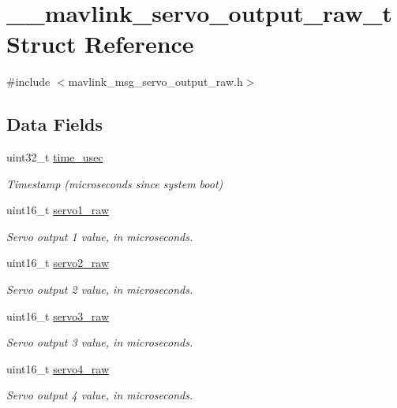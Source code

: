 \hypertarget{struct____mavlink__servo__output__raw__t}{\section{\+\_\+\+\_\+mavlink\+\_\+servo\+\_\+output\+\_\+raw\+\_\+t Struct Reference}
\label{struct____mavlink__servo__output__raw__t}
}


{\ttfamily \#include $<$mavlink\+\_\+msg\+\_\+servo\+\_\+output\+\_\+raw.\+h$>$}

\subsection*{Data Fields}
\begin{DoxyCompactItemize}
\item 
uint32\+\_\+t \hyperlink{struct____mavlink__servo__output__raw__t_a77950505a736593e2c35132a1688c8f1}{time\+\_\+usec}
\begin{DoxyCompactList}\small\item\em Timestamp (microseconds since system boot) \end{DoxyCompactList}\item 
uint16\+\_\+t \hyperlink{struct____mavlink__servo__output__raw__t_a5651abf79f8df0da7407b2329fedcdb2}{servo1\+\_\+raw}
\begin{DoxyCompactList}\small\item\em Servo output 1 value, in microseconds. \end{DoxyCompactList}\item 
uint16\+\_\+t \hyperlink{struct____mavlink__servo__output__raw__t_aa19900df91d866a507cf3261d4b6aeda}{servo2\+\_\+raw}
\begin{DoxyCompactList}\small\item\em Servo output 2 value, in microseconds. \end{DoxyCompactList}\item 
uint16\+\_\+t \hyperlink{struct____mavlink__servo__output__raw__t_a8aa15f79b56b08694b77bfa6d1788554}{servo3\+\_\+raw}
\begin{DoxyCompactList}\small\item\em Servo output 3 value, in microseconds. \end{DoxyCompactList}\item 
uint16\+\_\+t \hyperlink{struct____mavlink__servo__output__raw__t_aa9a775a58d71f44c00955771dc758012}{servo4\+\_\+raw}
\begin{DoxyCompactList}\small\item\em Servo output 4 value, in microseconds. \end{DoxyCompactList}\item 

\end{DoxyCompactItemize}
